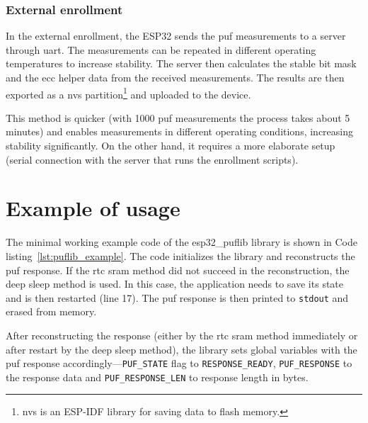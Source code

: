 \subsubsection*{External enrollment}

In the external enrollment, the ESP32 sends the \gls{puf} measurements to a server through \gls{uart}. The measurements can be repeated in different operating temperatures to increase stability. The server then calculates the stable bit mask and the \gls{ecc} helper data from the received measurements. The results are then exported as a \gls{nvs} partition\footnote{\gls{nvs} is an ESP-IDF library for saving data to flash memory.} and uploaded to the device.

This method is quicker (with 1000 \gls{puf} measurements the process takes about 5 minutes) and enables measurements in different operating conditions, increasing stability significantly. On the other hand, it requires a more elaborate setup (serial connection with the server that runs the enrollment scripts).

\section{Example of usage}

The minimal working example code of the esp32\_puflib library is shown in Code listing~\ref{lst:puflib_example}. The code initializes the library and reconstructs the \gls{puf} response. If the \gls{rtc} \gls{sram} method did not succeed in the reconstruction, the deep sleep method is used. In this case, the application needs to save its state and is then restarted (line 17). The \gls{puf} response is then printed to \lstinline{stdout} and erased from memory.

After reconstructing the response (either by the \gls{rtc} \gls{sram} method immediately or after restart by the deep sleep method), the library sets global variables with the \gls{puf} response accordingly---\lstinline{PUF_STATE} flag to \lstinline{RESPONSE_READY}, \lstinline{PUF_RESPONSE} to the response data and \lstinline{PUF_RESPONSE_LEN} to response length in bytes.


